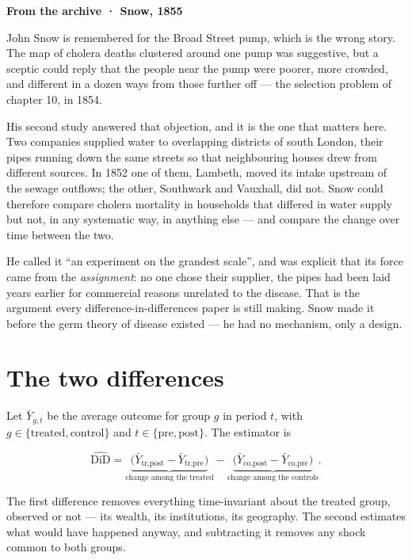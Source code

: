 \documentclass[
  letterpaper,
  10pt,
  twoside,
  openright,
  numbers=noenddot,
  chapterprefix=true]{scrbook}
\newenvironment{qmibarchive}
  {\par\medskip\noindent{\color{econgold}\rule{\linewidth}{1.4pt}}%
   \par\nobreak\vspace{4pt}\noindent\ignorespaces}
  {\par\vspace{2pt}\noindent{\color{econrule}\rule{\linewidth}{0.4pt}}\par\medskip}
\begin{document}
\begin{qmibarchive}

\textbf{From the archive · Snow, 1855}

John Snow is remembered for the Broad Street pump, which is the wrong
story. The map of cholera deaths clustered around one pump was
suggestive, but a sceptic could reply that the people near the pump were
poorer, more crowded, and different in a dozen ways from those further
off --- the selection problem of chapter 10, in 1854.

His second study answered that objection, and it is the one that matters
here. Two companies supplied water to overlapping districts of south
London, their pipes running down the same streets so that neighbouring
houses drew from different sources. In 1852 one of them, Lambeth, moved
its intake upstream of the sewage outflows; the other, Southwark and
Vauxhall, did not. Snow could therefore compare cholera mortality in
households that differed in water supply but not, in any systematic way,
in anything else --- and compare the change over time between the two.

He called it ``an experiment on the grandest scale'', and was explicit
that its force came from the \emph{assignment}: no one chose their
supplier, the pipes had been laid years earlier for commercial reasons
unrelated to the disease. That is the argument every
difference-in-differences paper is still making. Snow made it before the
germ theory of disease existed --- he had no mechanism, only a design.

\end{qmibarchive}

\section{The two differences}\label{the-two-differences}

Let \(\bar Y_{g,t}\) be the average outcome for group \(g\) in period
\(t\), with \(g \in \lbrace\text{treated}, \text{control}\rbrace\) and
\(t \in \lbrace\text{pre}, \text{post}\rbrace\). The estimator is

\[
\widehat{\text{DiD}}
=
\underbrace{\big(\bar Y_{\text{tr,post}} - \bar Y_{\text{tr,pre}}\big)}_{\text{change among the treated}}
-
\underbrace{\big(\bar Y_{\text{co,post}} - \bar Y_{\text{co,pre}}\big)}_{\text{change among the controls}} .
\]

The first difference removes everything time-invariant about the treated
group, observed or not --- its wealth, its institutions, its geography.
The second estimates what would have happened anyway, and subtracting it
removes any shock common to both groups.
\end{document}
